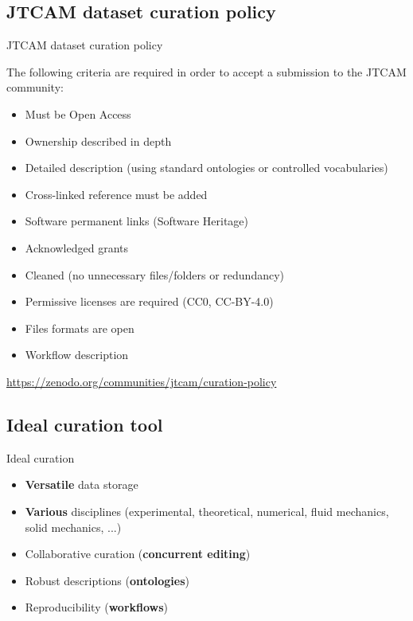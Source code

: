 \documentclass[10pt,compress,serif,aspectratio=169]{beamer}
\begin{document}

\subsection{JTCAM dataset curation policy}
\begin{frame}{JTCAM dataset curation policy}

The following criteria are required in order to accept a submission to the JTCAM community:

\begin{itemize}
\item Must be Open Access
\item Ownership described in depth
\item Detailed description (using standard ontologies or controlled vocabularies)
\item Cross-linked reference must be added
\item Software permanent links (Software Heritage)
\item Acknowledged grants
\item Cleaned (no unnecessary files/folders or redundancy)
\item Permissive licenses are required (CC0, CC-BY-4.0)
\item Files formats are open
\item Workflow description
\end{itemize}

\vfill
  \url{https://zenodo.org/communities/jtcam/curation-policy}

\end{frame}


\subsection{Ideal curation tool}
\begin{frame}[t]{Ideal curation}
  \vspace{1.5cm}
    {\large
  \begin{itemize}
    \item \textbf{Versatile} data storage
    \item \textbf{Various} disciplines (experimental, theoretical, numerical, fluid mechanics, solid mechanics, ...)
    \item Collaborative curation (\textbf{concurrent editing})
    \item Robust descriptions (\textbf{ontologies})
    \item Reproducibility (\textbf{workflows})
\end{itemize}
}
\end{frame}
\end{document}
